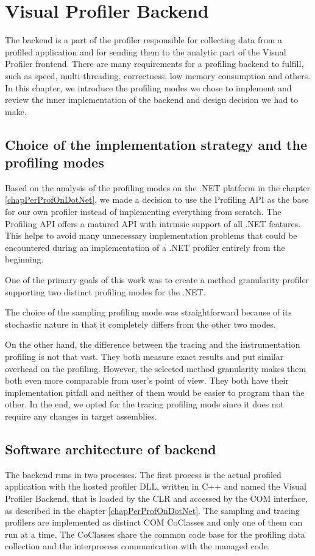 \chapter{Visual Profiler Backend}
\label{chap04:chapter}
The backend is a part of the profiler responsible for collecting data from a profiled application and for sending them to the analytic part of the Visual Profiler frontend. There are many requirements for a profiling backend to fulfill, such as speed, multi-threading, correctness, low memory consumption and others. In this chapter, we introduce the profiling modes we chose to implement and review the inner implementation of the backend and design decision we had to make.

\section{Choice of the implementation strategy and the profiling modes}
Based on the analysis of the profiling modes on the .NET platform in the chapter \ref{chapPerProfOnDotNet}, we made a decision to use the Profiling API as the base for our own profiler instead of implementing everything from scratch. The Profiling API offers a 	 matured API with intrinsic support of all .NET features. This helps to avoid many unnecessary implementation problems that could be encountered during an implementation of a .NET profiler entirely from the beginning.

One of the primary goals of this work was to create a method granularity profiler supporting two distinct profiling modes for the .NET.

The choice of the sampling profiling mode was straightforward because of its stochastic nature in that it completely differs from the other two modes. 

On the other hand, the difference between the tracing and the instrumentation profiling is not that vast. They both measure exact results and put similar overhead on the profiling. However, the selected method granularity makes them both even more comparable from user's point of view. They both have their implementation pitfall and neither of them would be easier to program than the other. In the end, we opted for the tracing profiling mode since it does not require any changes in target assemblies.

\section{Software architecture of backend }
The backend runs in two processes. The first process is the actual profiled application with the hosted profiler DLL, written in C++ and named the Visual Profiler Backend, that is loaded by the CLR and accessed by the COM interface, as described in the chapter \ref{chapPerProfOnDotNet}. The sampling and tracing profilers are implemented as distinct COM CoClasses and only one of them can run at a time. The CoClasses share the common code base for the profiling data collection and the interprocess communication with the managed code.

